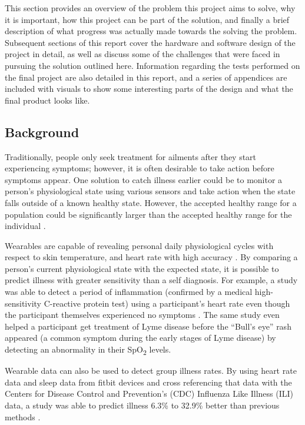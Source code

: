 This section provides an overview of the problem this project aims to solve,
why it is important, how this project can be part of the solution, and finally 
a brief description of what progress was actually made towards the solving the 
problem. Subsequent sections of this report cover the hardware and software design 
of the project in detail, as well as discuss some of the challenges that
were faced in pursuing the solution outlined here. Information regarding the
tests performed on the final project are also detailed in this report, and a
series of appendices are included with visuals to show some interesting parts 
of the design and what the final product looks like.

\subsection{Background}

Traditionally, people only seek treatment for ailments after they start
experiencing symptoms; however, it is often desirable to take action before
symptoms appear.  One solution to catch illness earlier could be to monitor a
person's physiological state using various sensors and take action when the
state falls outside of a known healthy state.  However, the accepted healthy
range for a population could be significantly larger than the accepted healthy
range for the individual \cite{Wearable-tracking2017}.

Wearables are capable of revealing personal daily physiological cycles with
respect to skin temperature, and heart rate with high accuracy
\cite{Wearable-tracking2017}. By comparing a person's current physiological
state with the expected state, it is possible to predict illness with greater
sensitivity than a self diagnosis. For example, a study was able to detect a
period of inflammation (confirmed by a medical high-sensitivity C-reactive
protein test) using a participant's heart rate even though the participant
themselves experienced no symptoms \cite{Wearable-tracking2017}.  The same
study even helped a participant get treatment of Lyme disease before the
``Bull's eye'' rash appeared (a common symptom during the early stages of Lyme
disease) by detecting an abnormality in their SpO\textsubscript{2} levels.

Wearable data can also be used to detect group illness rates.  By using heart
rate data and sleep data from fitbit devices and cross referencing that data
with the Centers for Disease Control and Prevention's (CDC) Influenza Like
Illness (ILI) data, a study was able to predict illness 6.3\% to 32.9\% better
than previous methods \cite{Radin2020}.

